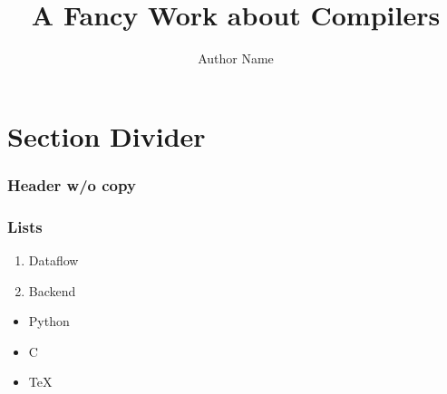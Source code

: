 \documentclass[fontset=fandol,aspectratio=169]{ctexbeamer}
\title{A Fancy Work about Compilers}
\author{Author Name}
\institute{Some institute}
\begin{document}
\begin{frame}[plain]
    \titlepage
\end{frame}

\section{Section Divider}

\begin{frame}
    \frametitle{Header w/o copy}

    \lipsum[1]

\end{frame}


\begin{frame}
    \frametitle{Lists}

    \begin{enumerate}
        \item Dataflow
        \item Backend
    \end{enumerate}

    \begin{itemize}
        \item Python
        \item C
        \item \TeX
    \end{itemize}

\end{frame}
\end{document}
